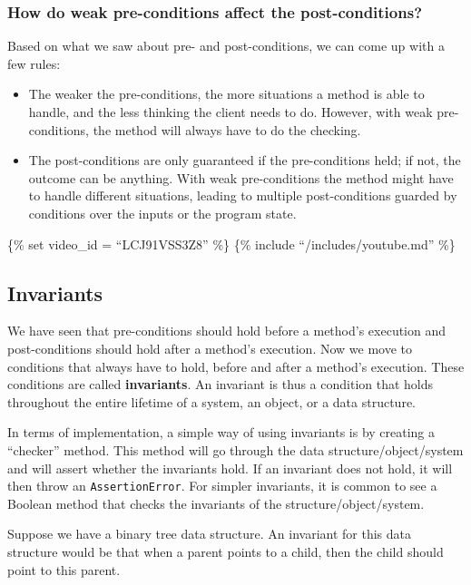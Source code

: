\hypertarget{how-do-weak-pre-conditions-affect-the-post-conditions}{%
\subsubsection{How do weak pre-conditions affect the
post-conditions?}\label{how-do-weak-pre-conditions-affect-the-post-conditions}}

Based on what we saw about pre- and post-conditions, we can come up with
a few rules:

\begin{itemize}
\item
  The weaker the pre-conditions, the more situations a method is able to
  handle, and the less thinking the client needs to do. However, with
  weak pre-conditions, the method will always have to do the checking.
\item
  The post-conditions are only guaranteed if the pre-conditions held; if
  not, the outcome can be anything. With weak pre-conditions the method
  might have to handle different situations, leading to multiple
  post-conditions guarded by conditions over the inputs or the program
  state.
\end{itemize}

\{\% set video\_id = ``LCJ91VSS3Z8'' \%\} \{\% include
``/includes/youtube.md'' \%\}

\hypertarget{invariants}{%
\subsection{Invariants}\label{invariants}}

We have seen that pre-conditions should hold before a method's execution
and post-conditions should hold after a method's execution. Now we move
to conditions that always have to hold, before and after a method's
execution. These conditions are called \textbf{invariants}. An invariant
is thus a condition that holds throughout the entire lifetime of a
system, an object, or a data structure.

In terms of implementation, a simple way of using invariants is by
creating a ``checker'' method. This method will go through the data
structure/object/system and will assert whether the invariants hold. If
an invariant does not hold, it will then throw an
\texttt{AssertionError}. For simpler invariants, it is common to see a
Boolean method that checks the invariants of the
structure/object/system.

Suppose we have a binary tree data structure. An invariant for this data
structure would be that when a parent points to a child, then the child
should point to this parent.

